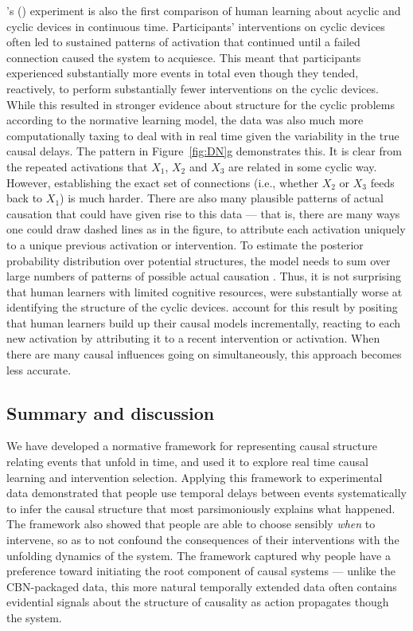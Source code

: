 \documentclass{cambridge7A}%
\def\citeapos#1{\citeauthor{#1}'s (\citeyear{#1})}
\begin{document}
\citeapos{bramley2017dynamic} experiment is also the first comparison of human learning about acyclic and cyclic devices in continuous time.  Participants' interventions on cyclic devices often led to sustained patterns of activation that continued until a failed connection caused the system to acquiesce.  This meant that participants experienced substantially more events in total even though they tended, reactively, to perform substantially fewer interventions on the cyclic devices.  While this resulted in stronger evidence about structure for the cyclic problems according to the normative learning model, the data was also much more computationally taxing to deal with in real time given the variability in the true causal delays.  The pattern in Figure~\ref{fig:DN}g demonstrates this.  It is clear from the repeated activations that $X_1$, $X_2$ and $X_3$ are related in some cyclic way.   However, establishing the exact set of connections (i.e., whether $X_2$ or $X_3$ feeds back to $X_1$) is much harder. There are also many plausible patterns of actual causation that could have given rise to this data --- that is, there are many ways one could draw dashed lines as in the figure, to attribute each activation uniquely to a unique previous activation or intervention.   To estimate the posterior probability distribution over potential structures, the model needs to sum over large numbers of patterns of possible actual causation \citep{halpern2016causality}.  Thus, it is not surprising that human learners with limited cognitive resources, were substantially worse at identifying the structure of the cyclic devices.  \cite{bramley2017dynamic} account for this result by positing that human learners build up their causal models incrementally, reacting to each new activation by attributing it to a recent intervention or activation.  When there are many causal influences going on simultaneously, this approach becomes less accurate.

\subsection{Summary and discussion}

We have developed a normative framework for representing causal structure relating events that unfold in time, and used it to explore real time causal learning and intervention selection.   Applying this framework to experimental data demonstrated that people use temporal delays between events systematically to infer the causal structure that most parsimoniously explains what happened.  %
The framework also showed that people are able to choose sensibly \emph{when} to intervene, so as to not confound the consequences of their interventions with the unfolding dynamics of the system. The framework captured why people have a preference toward initiating the root component of causal systems --- unlike the CBN-packaged data, this more natural temporally extended data often contains evidential signals about the structure of causality as action propagates though the system.
\end{document}
